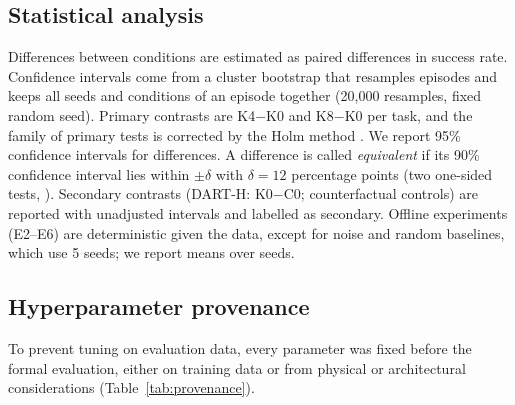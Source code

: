 \subsection{Statistical analysis}
\label{sec:stats}
Differences between conditions are estimated as paired differences in success rate. Confidence intervals come from a cluster bootstrap that resamples episodes and keeps all seeds and conditions of an episode together (20{,}000 resamples, fixed random seed). Primary contrasts are K4$-$K0 and K8$-$K0 per task, and the family of primary tests is corrected by the Holm method \citep{holm1979simple}. We report 95\% confidence intervals for differences. A difference is called \emph{equivalent} if its 90\% confidence interval lies within $\pm\delta$ with $\delta=12$ percentage points (two one-sided tests, \citealp{schuirmann1987tost}). Secondary contrasts (DART-H: K0$-$C0; counterfactual controls) are reported with unadjusted intervals and labelled as secondary. Offline experiments (E2--E6) are deterministic given the data, except for noise and random baselines, which use 5 seeds; we report means over seeds.

\subsection{Hyperparameter provenance}
To prevent tuning on evaluation data, every parameter was fixed before the formal evaluation, either on training data or from physical or architectural considerations (Table~\ref{tab:provenance}).

